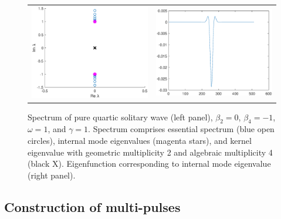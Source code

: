 \documentclass[12pt]{elsarticle}
\begin{document}
\begin{figure}[H]
\centering
\begin{tabular}{cc}
\includegraphics[width=8cm]{images/PQSspec.eps} &
\includegraphics[width=8cm]{images/PQSinternalmode.eps}
\end{tabular}
\caption{Spectrum of pure quartic solitary wave (left panel), $\beta_2 = 0$, $\beta_4 = -1$, $\omega = 1$, and $\gamma = 1$. Spectrum comprises essential spectrum (blue open circles), internal mode eigenvalues (magenta stars), and kernel eigenvalue with geometric multiplicity 2 and algebraic multiplicity 4 (black X). Eigenfunction corresponding to internal mode eigenvalue (right panel).}
\label{fig:PQSspec}
\end{figure} 

\subsection{Construction of multi-pulses}
\end{document}
